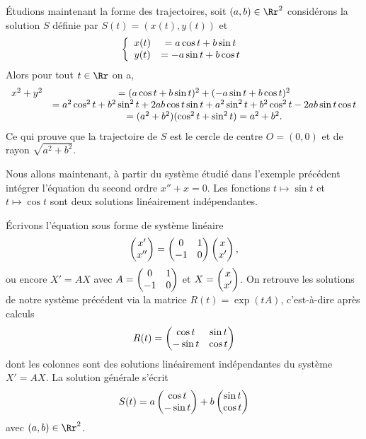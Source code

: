 \documentclass[class=report,crop=false]{standalone}
\begin{document}
\begin{exemple}
\'Etudions maintenant la forme des trajectoires, soit $(a,b)\in\Rr^2$ 
considérons la solution $S$ définie par $S(t)=(x(t),y(t))$ et
$$\left\{\begin{array}{cc}x(t)&=a\cos t+ b\sin t\cr y(t)&=-a\sin t+b\cos t\end{array}\right.$$
Alors pour tout $t\in\Rr$ on a,
$$\begin{array}{cc}x^2+y^2&=(a\cos t+ b\sin t)^2+(-a\sin t+b\cos t)^2\cr
&=a^2\cos^2t+b^2\sin^2t+2ab\cos t\sin t+a^2\sin^2t+b^2\cos^2t-2ab\sin t\cos t\cr
&=(a^2+b^2)(\cos^2t+\sin^2t)=a^2+b^2.\end{array}$$
Ce qui prouve que la trajectoire de $S$ est le cercle de centre 
$O=(0,0)$ et de rayon $\sqrt{a^2+b^2}$.  
\end{exemple}


\begin{exemple}
Nous allons maintenant, à partir du système étudié 
dans l'exemple précédent intégrer l'équation du second ordre $x''+x=0$. 
Les fonctions $t\mapsto\sin t$ et $t\mapsto\cos t$ sont deux solutions 
linéairement indépendantes. 

\'Ecrivons l'équation sous forme de système linéaire
$$\left(\begin{matrix}x'\cr x''\end{matrix}\right)=\left(\begin{matrix}0&1\cr-1&0\end{matrix}\right)\left(\begin{matrix}x\cr x'\end{matrix}\right),$$
ou encore $X'=AX$ avec $A=\left(\begin{matrix}0&1\cr-1&0\end{matrix}\right)$ et $X=\left(\begin{matrix}x\cr x'\end{matrix}\right)$.
On retrouve les solutions de notre système précédent via la matrice $R(t)=\exp (tA)$, c'est-à-dire après calculs 
$$R(t)
=\left(\begin{matrix}\cos t&\sin t\cr-\sin t&\cos t\end{matrix}\right)$$
dont les colonnes sont des solutions linéairement indépendantes du système $X'=AX$.
La solution générale s'écrit
$$S(t)=a\left(\begin{matrix}\cos t\cr -\sin t\end{matrix}\right)+b\left(\begin{matrix}\sin t\cr \cos t\end{matrix}\right)$$
avec $(a,b)\in\Rr^2$.


\end{exemple}
\end{document}
